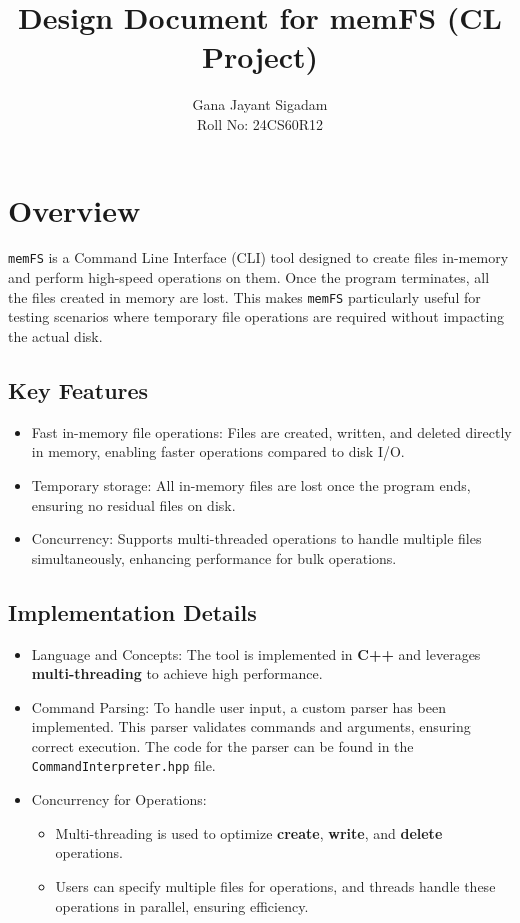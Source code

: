 \documentclass{article}
\title{Design Document for memFS (CL Project)}
\author{
      Gana Jayant Sigadam \\
      Roll No: 24CS60R12 \\
}
\begin{document}
\maketitle


\section{Overview}

\texttt{memFS} is a Command Line Interface (CLI) tool designed to create files in-memory and perform high-speed operations on them. Once the program terminates, all the files created in memory are lost. This makes \texttt{memFS} particularly useful for testing scenarios where temporary file operations are required without impacting the actual disk.

\subsection*{Key Features}
\begin{itemize}
    \item Fast in-memory file operations: Files are created, written, and deleted directly in memory, enabling faster operations compared to disk I/O.
    \item Temporary storage: All in-memory files are lost once the program ends, ensuring no residual files on disk.
    \item Concurrency: Supports multi-threaded operations to handle multiple files simultaneously, enhancing performance for bulk operations.
\end{itemize}

\subsection*{Implementation Details}
\begin{itemize}
    \item Language and Concepts: The tool is implemented in \textbf{C++} and leverages \textbf{multi-threading} to achieve high performance.
    \item Command Parsing: To handle user input, a custom parser has been implemented. This parser validates commands and arguments, ensuring correct execution. The code for the parser can be found in the \texttt{CommandInterpreter.hpp} file.
    \item Concurrency for Operations:
    \begin{itemize}
        \item Multi-threading is used to optimize \textbf{create}, \textbf{write}, and \textbf{delete} operations.
        \item Users can specify multiple files for operations, and threads handle these operations in parallel, ensuring efficiency.
    \end{itemize}
\end{itemize}
\end{document}
